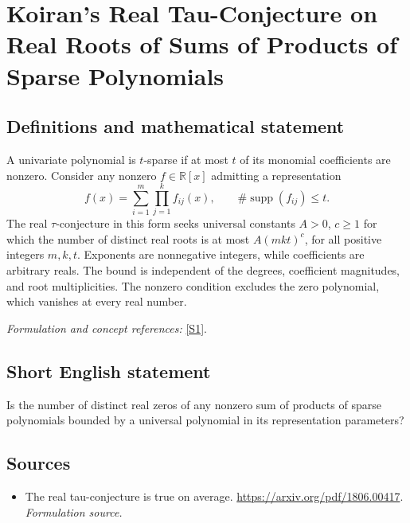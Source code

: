 \documentclass[11pt]{article}
\begin{document}
\section*{\texorpdfstring{Koiran's Real Tau-Conjecture on Real Roots of Sums of Products of Sparse Polynomials}{Koiran's Real Tau-Conjecture on Real Roots of Sums of Products of Sparse Polynomials}}\label{340}
\subsection{Definitions and mathematical statement}
A univariate polynomial is $t$-sparse if at most $t$ of its monomial coefficients are nonzero. Consider any nonzero $f\in{\mathbb{R}}[x]$ admitting a representation
\[
 f(x)=\sum_{i=1}^{m}\prod_{j=1}^{k}f_{ij}(x),
 \qquad \#\operatorname{supp}(f_{ij})\le t.
\]
The real $\tau$-conjecture in this form seeks universal constants $A>0$, $c\ge1$ for which the number of distinct real roots is at most $A(mkt)^c$, for all positive integers $m,k,t$. Exponents are nonnegative integers, while coefficients are arbitrary reals. The bound is independent of the degrees, coefficient magnitudes, and root multiplicities. The nonzero condition excludes the zero polynomial, which vanishes at every real number.
\par\smallskip\textit{Formulation and concept references:} \href{https://arxiv.org/pdf/1806.00417}{[S1]}.

\subsection{Short English statement}
Is the number of distinct real zeros of any nonzero sum of products of sparse polynomials bounded by a universal polynomial in its representation parameters?
\subsection{Sources}
\begin{itemize}
\item[S1]The real tau-conjecture is true on average.
\url{https://arxiv.org/pdf/1806.00417}.
\textit{Formulation source.}
\end{itemize}
\end{document}
